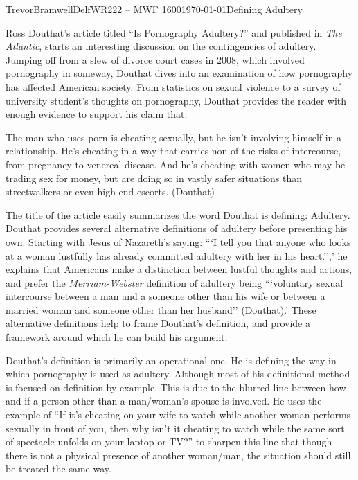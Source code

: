 \documentclass[12pt,letterpaper]{article}
\begin{document}
\begin{mla}{Trevor}{Bramwell}{Delf}{WR222 -- MWF 1600}{\today}{Defining Adultery}

Ross Douthat's article titled ``Is Pornography Adultery?'' and published
in \emph{The Atlantic}, starts an interesting discussion on the 
contingencies of adultery. Jumping off from a slew of divorce court cases 
in 2008, which involved pornography in someway, Douthat dives into an
examination of how pornography has affected American society. From statistics
on sexual violence to a survey of university student's thoughts on pornography,
Douthat provides the reader with enough evidence to support his claim that:
\begin{blocks}
The man who uses porn is cheating sexually, but he isn't involving himself in a relationship.
He's cheating in a way that carries non of the risks of intercourse, from pregnancy to 
venereal disease. And he's cheating with women who may be trading sex for money, but are 
doing so in vastly safer situations than streetwalkers or even high-end escorts. (Douthat)
\end{blocks}

The title of the article easily summarizes the word Douthat is defining: Adultery.
Douthat provides several alternative definitions of adultery before presenting his own.
Starting with Jesus of Nazareth's saying: ```I tell you that anyone who looks at a woman 
lustfully has already committed adultery with her in his heart.'',' he explains that 
Americans make a distinction between lustful thoughts and actions, and prefer the
\emph{Merriam-Webster} definition of adultery being ```voluntary sexual intercourse between a man 
and a someone other than his wife or between a married woman and someone other than her husband'' (Douthat).'
These alternative definitions help to frame Douthat's definition, and provide a framework around 
which he can build his argument.

Douthat's definition is primarily an operational one. He is defining the way in which
pornography is used as adultery. Although most of his definitional method is focused
on definition by example. This is due to the blurred line between how and if a person
other than a man/woman's spouse is involved. He uses the example of ``If it's cheating
on your wife to watch while another woman performs sexually in front of you, then why isn't
it cheating to watch while the same sort of spectacle unfolds on your laptop or TV?'' to
sharpen this line that though there is not a physical presence of another woman/man, the
situation should still be treated the same way.


\end{mla}
\end{document}
